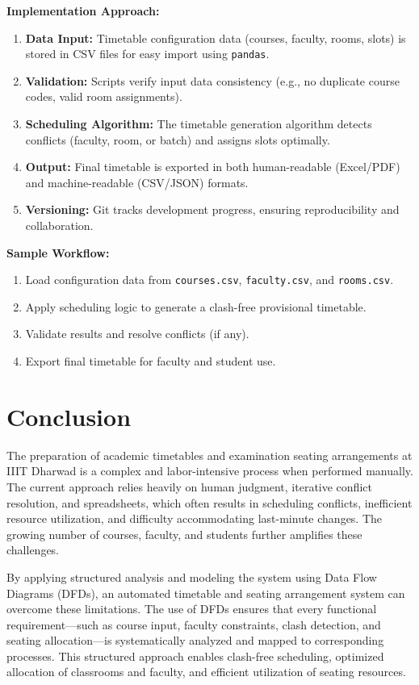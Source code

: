 \documentclass[12pt]{article}
\begin{document}
\textbf{Implementation Approach:}
\begin{enumerate}
    \item \textbf{Data Input:} Timetable configuration data (courses, faculty, rooms, slots) is stored in CSV files for easy import using \texttt{pandas}.
    \item \textbf{Validation:} Scripts verify input data consistency (e.g., no duplicate course codes, valid room assignments).
    \item \textbf{Scheduling Algorithm:} The timetable generation algorithm detects conflicts (faculty, room, or batch) and assigns slots optimally.
    \item \textbf{Output:} Final timetable is exported in both human-readable (Excel/PDF) and machine-readable (CSV/JSON) formats.
    \item \textbf{Versioning:} Git tracks development progress, ensuring reproducibility and collaboration.
\end{enumerate}

\textbf{Sample Workflow:}
\begin{enumerate}
    \item Load configuration data from \texttt{courses.csv}, \texttt{faculty.csv}, and \texttt{rooms.csv}.
    \item Apply scheduling logic to generate a clash-free provisional timetable.
    \item Validate results and resolve conflicts (if any).
    \item Export final timetable for faculty and student use.
\end{enumerate}

\section{Conclusion}

The preparation of academic timetables and examination seating arrangements at IIIT Dharwad is a complex and labor-intensive process when performed manually. The current approach relies heavily on human judgment, iterative conflict resolution, and spreadsheets, which often results in scheduling conflicts, inefficient resource utilization, and difficulty accommodating last-minute changes. The growing number of courses, faculty, and students further amplifies these challenges.

By applying structured analysis and modeling the system using Data Flow Diagrams (DFDs), an automated timetable and seating arrangement system can overcome these limitations. The use of DFDs ensures that every functional requirement—such as course input, faculty constraints, clash detection, and seating allocation—is systematically analyzed and mapped to corresponding processes. This structured approach enables clash-free scheduling, optimized allocation of classrooms and faculty, and efficient utilization of seating resources.
\end{document}
